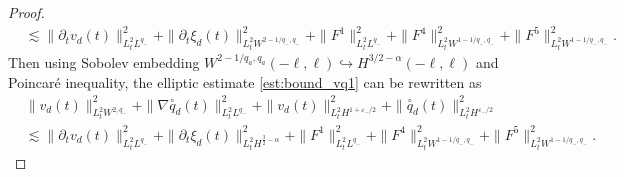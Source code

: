 \documentclass[letterpaper,reqno,10pt,twoside]{amsart}
\theoremstyle{definition}
\theoremstyle{remark}
\def\p{\partial}
\begin{document}
\begin{proof}
\begin{equation}
\begin{aligned}
				&\lesssim \|\p_tv_{d}(t)\|_{L_{t}^{2}L^{q_-}}^2 +\|\p_t\xi_{d}(t)\|_{L_{t}^{2}W^{2-1/q_-,q_-}}^2+\|F^1\|_{L_{t}^{2}L^{q_-}}^2+\|F^{4}\|_{L_{t}^{2}W^{1-1/q_-,q_-}}^2
				+\|F^5\|_{L_{t}^{2}W^{1-1/q_-,q_-}}^2.
			\end{aligned}
		\end{equation}
		{Then using Sobolev embedding $W^{2-1/q_a,q_a}(-\ell, \ell) \hookrightarrow H^{3/2-\alpha}(-\ell, \ell)$ and Poincar\'e inequality, the elliptic estimate \eqref{est:bound_vq1} can  be rewritten as
			\[
			\begin{aligned}
				&\|v_{d}(t)\|_{L_{t}^{2}W^{2,q_-}}^2+\|\nabla \overset{\circ}q_{d}(t)\|_{L_{t}^{2}L^{q_-}}^2 + \|v_{d}(t)\|_{L_{t}^{2}H^{1+\varepsilon_-/2}}^2 + \|\overset{\circ}q_{d}(t)\|_{L_{t}^{2}H^{\varepsilon_-/2}}^2\\
				&\lesssim \|\p_tv_{d}(t)\|_{L_{t}^{2}L^{q_-}}^2 +\|\p_t\xi_{d}(t)\|_{L_{t}^{2}H^{\frac{3}{2}-\alpha}}^2+\|F^1\|_{L_{t}^{2}L^{q_-}}^2+\|F^{4}\|_{L_{t}^{2}W^{1-1/q_-,q_-}}^2 +\|F^5\|_{L_{t}^{2}W^{1-1/q_-,q_-}}^2.
			\end{aligned}
			\]
		}
		

\end{proof}
\end{document}
